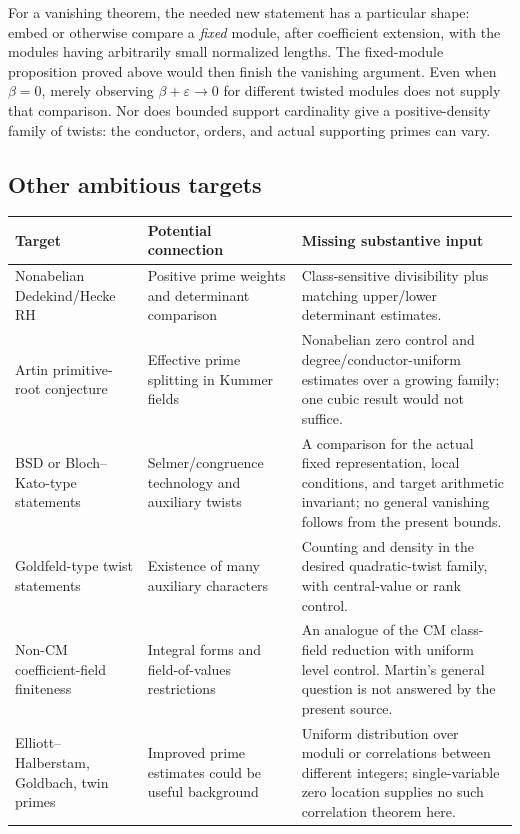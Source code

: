 \documentclass[11pt,letterpaper]{article}
\theoremstyle{definition}
\theoremstyle{remark}
\begin{document}
For a vanishing theorem, the needed new statement has a particular
shape: embed or otherwise compare a \emph{fixed} module, after coefficient
extension, with the modules having arbitrarily small normalized lengths.
The fixed-module proposition proved above would then finish the
vanishing argument. Even when $\beta=0$, merely observing $\beta+\varepsilon\to0$ for
different twisted modules does not supply that comparison. Nor does
bounded support cardinality give a positive-density family of twists:
the conductor, orders, and actual supporting primes can vary.

\subsection{Other ambitious targets}

\begin{longtable}{@{}p{}p{}p{}@{}}
\toprule
Target & Potential connection & Missing substantive input\\
\midrule
\endhead
Nonabelian Dedekind/Hecke RH &
Positive prime weights and determinant comparison &
Class-sensitive divisibility plus matching upper/lower determinant estimates.\\[5pt]
Artin primitive-root conjecture &
Effective prime splitting in Kummer fields &
Nonabelian zero control and degree/conductor-uniform estimates over a growing family; one cubic result would not suffice.\\[5pt]
BSD or Bloch--Kato-type statements &
Selmer/congruence technology and auxiliary twists &
A comparison for the actual fixed representation, local conditions, and target arithmetic invariant; no general vanishing follows from the present bounds.\\[5pt]
Goldfeld-type twist statements &
Existence of many auxiliary characters &
Counting and density in the desired quadratic-twist family, with central-value or rank control.\\[5pt]
Non-CM coefficient-field finiteness &
Integral forms and field-of-values restrictions &
An analogue of the CM class-field reduction with uniform level control. Martin's general question is not answered by the present source.\\[5pt]
Elliott--Halberstam, Goldbach, twin primes &
Improved prime estimates could be useful background &
Uniform distribution over moduli or correlations between different integers; single-variable zero location supplies no such correlation theorem here.\\
\bottomrule
\end{longtable}
\end{document}
